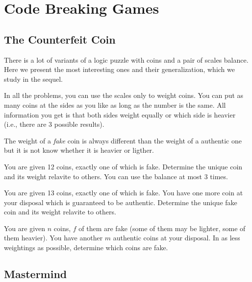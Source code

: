 \chapter{Code Breaking Games}
\label{ch:games}

\section{The Counterfeit Coin}

There is a lot of variants of a logic puzzle with coins and a pair of scales balance.
Here we present the most interesting ones and their generalization, which we study in the sequel.

In all the problems, you can use the scales only to weight coins.
You can put as many coins at the sides as you like as long as the number is the same.
All information you get is that both sides weight equally or which side is heavier (i.e., there are 3 possible results).

The weight of a \emph{fake} coin is always different than
the weight of a authentic one
but it is not know whether it is heavier or ligther.

\begin{problem}
You are given 12 coins, exactly one of which is fake.
Determine the unique coin and its weight relavite to others.
You can use the balance at most 3 times.
\end{problem}

\begin{problem}
You are given 13 coins, exactly one of which is fake.
You have one more coin at your disposal which is guaranteed to be authentic.
Determine the unique fake coin and its weight relavite to others.
\end{problem}

\begin{problem}
You are given $n$ coins, $f$ of them are fake (some of them may be lighter, some of them heavier).
You have another $m$ authentic coins at your disposal.
In as less weightings as possible, determine which coins are fake.
\end{problem}

\section{Mastermind}

